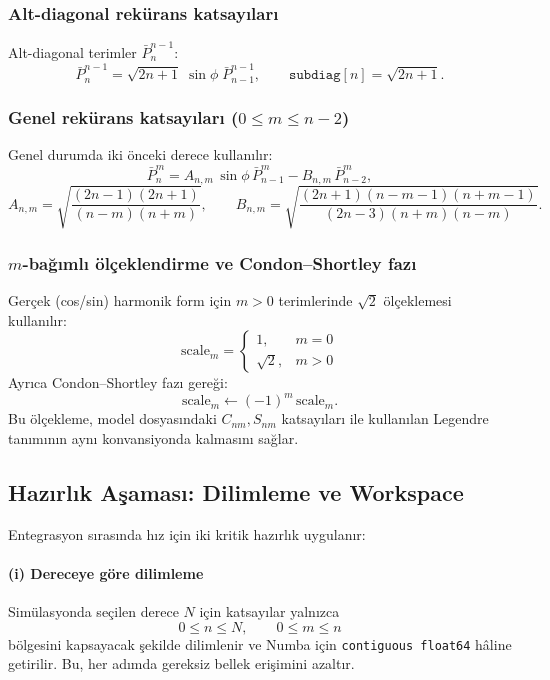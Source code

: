 \subsubsection*{Alt-diagonal rekürans katsayıları}

Alt-diagonal terimler $\bar{P}_n^{n-1}$:
\[
\bar{P}_n^{n-1}
=
\sqrt{2n+1}
\;\sin\phi\;
\bar{P}_{n-1}^{n-1},
\qquad
\texttt{subdiag}[n] = \sqrt{2n+1}.
\]

\subsubsection*{Genel rekürans katsayıları ($0 \le m \le n-2$)}

Genel durumda iki önceki derece kullanılır:
\[
\bar{P}_n^m
=
A_{n,m}\,\sin\phi\,\bar{P}_{n-1}^m
-
B_{n,m}\,\bar{P}_{n-2}^m,
\]
\[
A_{n,m}
=
\sqrt{
\frac{(2n-1)(2n+1)}{(n-m)(n+m)}
},
\qquad
B_{n,m}
=
\sqrt{
\frac{(2n+1)(n-m-1)(n+m-1)}{(2n-3)(n+m)(n-m)}
}.
\]

\subsubsection*{$m$-bağımlı ölçeklendirme ve Condon--Shortley fazı}

Gerçek (cos/sin) harmonik form için $m>0$ terimlerinde $\sqrt{2}$ ölçeklemesi kullanılır:
\[
\text{scale}_m =
\begin{cases}
1, & m = 0 \\
\sqrt{2}, & m > 0
\end{cases}
\]
Ayrıca Condon--Shortley fazı gereği:
\[
\text{scale}_m \leftarrow (-1)^m \,\text{scale}_m.
\]
Bu ölçekleme, model dosyasındaki $C_{nm},S_{nm}$ katsayıları ile kullanılan Legendre tanımının
aynı konvansiyonda kalmasını sağlar.

\subsection*{Hazırlık Aşaması: Dilimleme ve Workspace}

Entegrasyon sırasında hız için iki kritik hazırlık uygulanır:

\paragraph{(i) Dereceye göre dilimleme}
Simülasyonda seçilen derece $N$ için katsayılar yalnızca
\[
0 \le n \le N,\qquad 0 \le m \le n
\]
bölgesini kapsayacak şekilde dilimlenir ve Numba için \texttt{contiguous float64} hâline getirilir.
Bu, her adımda gereksiz bellek erişimini azaltır.

